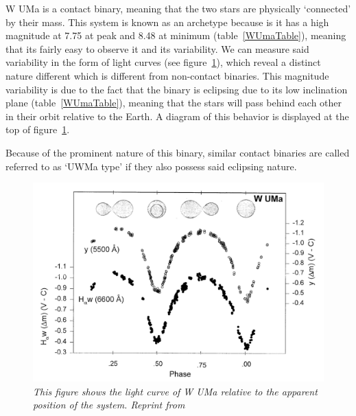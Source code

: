 \documentclass[12pt, a4paper]{article}
\begin{document}
        W UMa is a contact binary, meaning that the two stars are physically `connected' by their mass. This system is known as an archetype because is it has a high magnitude at 7.75 at peak and 8.48 at minimum (table~\ref{WUmaTable}), meaning that its fairly easy to observe it and its variability. We can measure said variability in the form of light curves (see figure~\ref{WUMaLightcruve}), which reveal a distinct nature different which is different from non-contact binaries. This magnitude variability is due to the fact that the binary is eclipsing due to its low inclination plane (table~\ref{WUmaTable}), meaning that the stars will pass behind each other in their orbit relative to the Earth. A diagram of this behavior is displayed at the top of figure~\ref{WUMaLightcruve}.

        Because of the prominent nature of this binary, similar contact binaries are called referred to as `UWMa type' if they also possess said eclipsing nature. 

        \begin{figure}[H]
            \centering
            \includegraphics[width= \textwidth]{figs/reused-figs/WUMaLightcurve.png}
            \caption{\textit{This figure shows the light curve of W UMa relative to the apparent position of the system. Reprint from~\parencite{Morgan_1997}}}
            \label{WUMaLightcruve}
        \end{figure}

\end{document}
